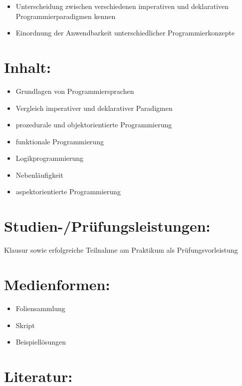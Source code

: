 \begin{itemize}
\item
  Unterscheidung zwischen verschiedenen imperativen und deklarativen
  Programmierparadigmen kennen
\item
  Einordnung der Anwendbarkeit unterschiedlicher Programmierkonzepte
\end{itemize}

\section*{Inhalt:}\label{inhalt-17}

\begin{itemize}
\item
  Grundlagen von Programmiersprachen
\item
  Vergleich imperativer und deklarativer Paradigmen
\item
  prozedurale und objektorientierte Programmierung
\item
  funktionale Programmierung
\item
  Logikprogrammierung
\item
  Nebenläufigkeit
\item
  aspektorientierte Programmierung
\end{itemize}

\section*{Studien-/Prüfungsleistungen:}\label{studien-pruxfcfungsleistungen-12}

Klausur sowie erfolgreiche Teilnahme am Praktikum als
Prüfungsvorleistung

\section*{Medienformen:}\label{medienformen-8}

\begin{itemize}
\item
  Foliensammlung
\item
  Skript
\item
  Beispiellösungen
\end{itemize}

\section*{Literatur:}\label{literatur-14}

